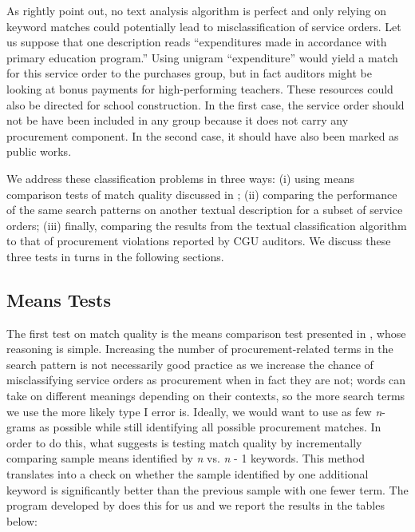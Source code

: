 \documentclass[11pt]{article}
\begin{document}
As \citet{GrimmerTextDataPromise2013a} rightly point out, no text analysis algorithm is perfect and only relying on keyword matches could potentially lead to misclassification of service orders. Let us suppose that one description reads ``expenditures made in accordance with primary education program.'' Using unigram ``expenditure'' would yield a match for this service order to the purchases group, but in fact auditors might be looking at bonus payments for high-performing teachers. These resources could also be directed for school construction. In the first case, the service order should not be have been included in any group because it does not carry any procurement component. In the second case, it should have also been marked as public works.

We address these classification problems in three ways: (i) using means comparison tests of match quality discussed in \citet{AssumpcaotextfindDataDrivenText2018}; (ii) comparing the performance of the same search patterns on another textual description for a subset of service orders; (iii) finally, comparing the results from the textual classification algorithm to that of procurement violations reported by CGU auditors. We discuss these three tests in turns in the following sections.

\subsection{Means Tests}\label{subsec:quality1}

The first test on match quality is the means comparison test presented in \citet{AssumpcaotextfindDataDrivenText2018}, whose reasoning is simple. Increasing the number of procurement-related terms in the search pattern is not necessarily good practice as we increase the chance of misclassifying service orders as procurement when in fact they are not; words can take on different meanings depending on their contexts, so the more search terms we use the more likely type I error is. Ideally, we would want to use as few \emph{n}-grams as possible while still identifying all possible procurement matches. In order to do this, what \citet{AssumpcaotextfindDataDrivenText2018} suggests is testing match quality by incrementally comparing sample means identified by \emph{n} vs. \emph{n} - 1 keywords. This method translates into a check on whether the sample identified by one additional keyword is significantly better than the previous sample with one fewer term. The program developed by \citet{AssumpcaotextfindDataDrivenText2018} does this for us and we report the results in the tables below:
\end{document}
